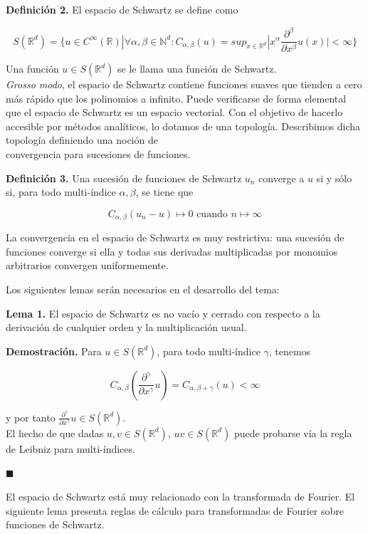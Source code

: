 \begin{itemize}
\textbf{Definición 2.} El espacio de Schwartz se define como 

$$S(\mathbb{R}^d) = \{u \in C^\infty(\mathbb{R}) | \forall \alpha,\beta \in \mathbb{N}^d: C_{\alpha,\beta}(u) = sup_{x \in \mathbb{R}^d} |x^\alpha \frac{\partial^\beta}{\partial x^\beta}u(x)| < \infty \}$$

Una función $u \in S(\mathbb{R}^d)$ se le llama una función de Schwartz.\\

\textit{Grosso modo}, el espacio de Schwartz contiene funciones suaves que tienden a cero más rápido que los polinomios a infinito. Puede verificarse de forma elemental que el espacio de Schwartz es un espacio vectorial. Con el objetivo de hacerlo accesible por métodos analíticos, lo dotamos de una topología. Describimos dicha topología definiendo una noción de \\convergencia para sucesiones de funciones.

\textbf{Definición 3.} Una sucesión de funciones de Schwartz ${u_n}$ converge a $u$ si y sólo si, para todo multi-índice $\alpha, \beta$, se tiene que 

$$C_{\alpha,\beta}(u_n - u) \mapsto 0 \text{    cuando } n \mapsto \infty$$

La convergencia en el espacio de Schwartz es muy restrictiva: una sucesión de funciones converge si ella y todas sus derivadas multiplicadas por monomios arbitrarios convergen uniformemente. 

Los siguientes lemas serán necesarios en el desarrollo del tema:

\textbf{Lema 1.} El espacio de Schwartz es no vacío y cerrado con respecto a la derivación de cualquier orden y la multiplicación usual.

\textbf{Demostración.} Para $u \in S(\mathbb{R}^d)$, para todo multi-índice $\gamma$, tenemos 

$$C_{\alpha,\beta}(\frac{\partial^\gamma}{\partial x^\gamma}u) = C_{\alpha,\beta+\gamma}(u) < \infty$$

y por tanto $\frac{\partial^\gamma}{\partial x^\gamma}u \in S(\mathbb{R}^d)$. \\

El hecho de que dadas $u, v \in S(\mathbb{R}^d)$, $uv \in S(\mathbb{R}^d)$ puede probarse vía la regla de Leibniz para multi-índices.

\hfill$\blacksquare$

El espacio de Schwartz está muy relacionado con la transformada de Fourier. El siguiente lema presenta reglas de cálculo para transformadas de Fourier sobre funciones de Schwartz.


\end{itemize}
